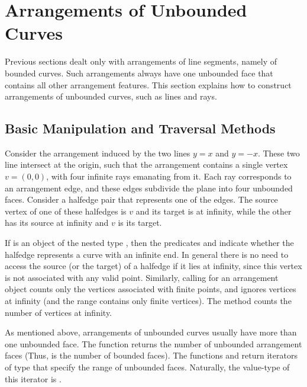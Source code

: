 \section{Arrangements of Unbounded Curves\label{arr_sec:unbounded}}

Previous sections dealt only with arrangements of line segments,
namely of bounded curves. Such arrangements always have one unbounded
face that contains all other arrangement features. This section
explains how to construct arrangements of unbounded curves, such as
lines and rays.

\subsection{Basic Manipulation and Traversal Methods\label{arr_ssec:unb_basic}}

Consider the arrangement induced by the two lines $y = x$ and
$y = -x$. These two line intersect at the origin, such that the
arrangement contains a single vertex $v = (0,0)$, with four infinite
rays emanating from it. Each ray corresponds to an arrangement edge,
and these edges subdivide the plane into four unbounded faces.
Consider a halfedge pair that represents one of the edges. The source
vertex of one of these halfedges is $v$ and its target is at infinity,
while the other has its source at infinity and $v$ is its target.

If  is an object of the nested type
, then the predicates
 and  indicate
whether the halfedge represents a curve with an infinite end.
In general there is no need to access the source (or the target) of a
halfedge if it lies at infinity, since this vertex is not associated
with any valid point. Similarly, calling 
for an arrangement object  counts only the vertices
associated with finite points, and ignores vertices at infinity
(and the range \ccc{[vertices_begin(), vertices_end())} contains only
finite vertices). The method 
counts the number of vertices at infinity.

As mentioned above, arrangements of unbounded curves usually have more
than one unbounded face. The function 
returns the number of unbounded arrangement faces
(Thus, 
is the number of bounded faces).
The functions  and
 return iterators of type
 that specify the range
of unbounded faces. Naturally, the value-type of this iterator is
.

